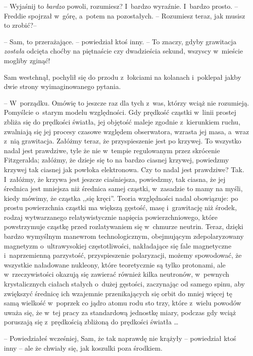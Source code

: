 \documentclass[oneside,polish,11pt,rmheadings]{mwbk}
\begin{document}
 -- Wyjaśnij to \textit{bardzo } powoli, rozumiesz? I~bardzo wyraźnie. I~bardzo prosto. -- Freddie spojrzał w~górę, a~potem na pozostałych. -- Rozumiesz teraz, jak musisz to zrobić?-- 

-- Sam, to przerażające. -- powiedział ktoś inny. -- To znaczy, gdyby grawitacja \textit{została } odcięta choćby na piętnaście czy dwadzieścia sekund, wszyscy w~mieście mogliby zginąć! 

Sam westchnął, pochylił się do przodu z~łokciami na kolanach i~poklepał jakby dwie strony wyimaginowanego pytania.

 -- W~porządku. Omówię to jeszcze raz dla tych z~was, którzy wciąż nie rozumieją. Pomyślcie o~starym modelu względności. Gdy prędkość cząstki w~linii prostej zbliża się do prędkości światła, jej objętość maleje zgodnie z~kierunkiem ruchu, zwalniają się jej procesy czasowe względem obserwatora, wzrasta jej masa, a~wraz z~nią grawitacja. Załóżmy teraz, że przyspieszenie jest po krzywej. To wszystko nadal jest prawdziwe, tyle że nie w~tempie regulowanym przez skrócenie Fitzgeralda; załóżmy, że dzieje się to na bardzo ciasnej krzywej, powiedzmy krzywej tak ciasnej jak powłoka elektronowa. Czy to nadal jest prawdziwe? Tak. I~załóżmy, że krzywa jest jeszcze ciaśniejsza, powiedzmy, tak ciasna, że jej średnica jest mniejsza niż średnica samej cząstki, w~zasadzie to mamy na myśli, kiedy mówimy, że cząstka ,,się kręci''. Teoria względności nadal obowiązuje: po prostu powierzchnia cząstki ma większą gęstość, masę i~grawitację niż środek, rodzaj wytwarzanego relatywistycznie napięcia powierzchniowego, które powstrzymuje cząstkę przed rozlatywaniem się w~chmurze neutrin. Teraz, dzięki bardzo wymyślnym manewrom technologicznym, obejmującym zdepolaryzowany magnetyzm o~ultrawysokiej częstotliwości, nakładające się fale magnetyczne i~naprzemienną parzystość, przyspieszenie polaryzacji, możemy spowodować, że wszystkie naładowane nukleony, które teoretycznie są tylko protonami, ale w~rzeczywistości okazują się zawierać również kilka neutronów, w~pewnych krystalicznych ciałach stałych o~dużej gęstości, zaczynając od samego spinu, aby zwiększyć średnicę ich wzajemnie przenikających się orbit do mniej więcej tę samą wielkość w~poprzek co jądro atomu rodu sto trzy, które z~wielu powodów uważa się, że w~tej pracy za standardową jednostkę miary, podczas gdy wciąż poruszają się z~prędkością zbliżoną do prędkości światła  \ldots 

-- Powiedziałeś wcześniej, Sam, że tak naprawdę nie krążyły -- powiedział ktoś inny -- ale że chwiały się, jak koszulki poza środkiem. 
\end{document}
